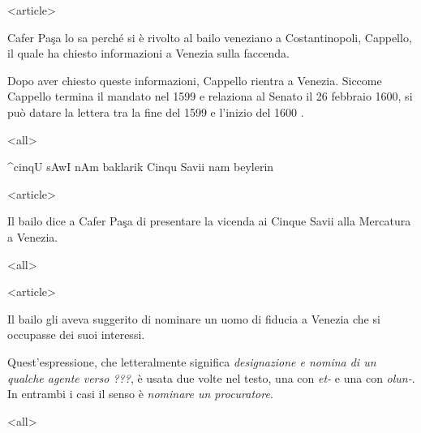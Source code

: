 

\mode
<article>

Cafer  Paşa  lo   sa  perché  si  è  rivolto   al  bailo  veneziano  a
Costantinopoli, Cappello,  il quale  ha chiesto informazioni  a Venezia
sulla faccenda.

Dopo   aver   chiesto   queste   informazioni,  Cappello   rientra   a
Venezia. Siccome Cappello  termina il mandato nel 1599  e relaziona al
Senato il 26  febbraio 1600, si può datare la lettera  tra la fine del
1599 e l'inizio del 1600 \cite{pedani2002}.

\mode
<all>

                   {^cinqU   {\setarab  sAwI}   nAm  {\setarab baklarik}}
                   {Cinqu Savii nam beylerin}

\mode
<article>

Il bailo  dice a Cafer Paşa  di presentare la vicenda  ai Cinque Savii
alla Mercatura a Venezia.

\mode
<all>


\mode
<article>

Il bailo gli aveva suggerito di  nominare un uomo di fiducia a Venezia
che si occupasse dei suoi interessi.

Quest'espressione,  che letteralmente  significa  {\it designazione  e
  nomina di un qualche agente verso ???}, è usata due volte
nel testo, una con {\it et-} e una con {\it olun-}. In entrambi i casi
il senso è {\it nominare un procuratore}.

\mode
<all>

